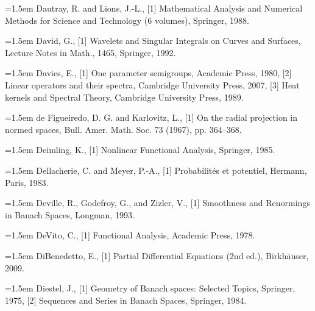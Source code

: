 \noindent\hangindent=1.5em Dautray, R. and Lions, J.-L., \hypertarget{ref:DautrayLions-1}{[1]} Mathematical Analysis and Numerical Methods for Science and Technology (6 volumes), Springer, 1988.\par{}
\noindent\hangindent=1.5em David, G., \hypertarget{ref:David-1}{[1]} Wavelets and Singular Integrals on Curves and Surfaces, Lecture Notes in Math., 1465, Springer, 1992.\par{}
\noindent\hangindent=1.5em Davies, E., \hypertarget{ref:Davies-1}{[1]} One parameter semigroups, Academic Press, 1980, \hypertarget{ref:Davies-2}{[2]} Linear operators and their spectra, Cambridge University Press, 2007, \hypertarget{ref:Davies-3}{[3]} Heat kernels and Spectral Theory, Cambridge University Press, 1989.\par{}
\noindent\hangindent=1.5em de Figueiredo, D. G. and Karlovitz, L., \hypertarget{ref:De-1}{[1]} On the radial projection in normed spaces, Bull. Amer. Math. Soc. 73 (1967), pp. 364--368.\par{}
\noindent\hangindent=1.5em Deimling, K., \hypertarget{ref:Deimling-1}{[1]} Nonlinear Functional Analysis, Springer, 1985.\par{}
\noindent\hangindent=1.5em Dellacherie, C. and Meyer, P.-A., \hypertarget{ref:DellacherieMeyer-1}{[1]} Probabilités et potentiel, Hermann, Paris, 1983.\par{}
\noindent\hangindent=1.5em Deville, R., Godefroy, G., and Zizler, V., \hypertarget{ref:Deville-1}{[1]} Smoothness and Renormings in Banach Spaces, Longman, 1993.\par{}
\noindent\hangindent=1.5em DeVito, C., \hypertarget{ref:DeVito-1}{[1]} Functional Analysis, Academic Press, 1978.\par{}
\noindent\hangindent=1.5em DiBenedetto, E., \hypertarget{ref:DiBenedetto-1}{[1]} Partial Differential Equations (2nd ed.), Birkhäuser, 2009.\par{}
\noindent\hangindent=1.5em Diestel, J., \hypertarget{ref:Diestel-1}{[1]} Geometry of Banach spaces: Selected Topics, Springer, 1975, \hypertarget{ref:Diestel-2}{[2]} Sequences and Series in Banach Spaces, Springer, 1984.\par{}
